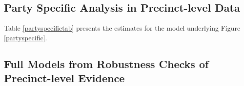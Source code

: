 \documentclass[12pt,a4paper]{article}
\begin{document}
	
	
	
	\subsection{Party Specific Analysis in Precinct-level Data} \label{app_partyspec}
	\setcounter{table}{0}
	
	Table \ref{partyspecifictab} presents the estimates for the model underlying Figure \ref{partyspecific}.
	
	
	
	
	\newpage
	
	\subsection{Full Models from Robustness Checks of Precinct-level Evidence} \label{app_robustpred}
	\setcounter{table}{0}
	
\end{document}
